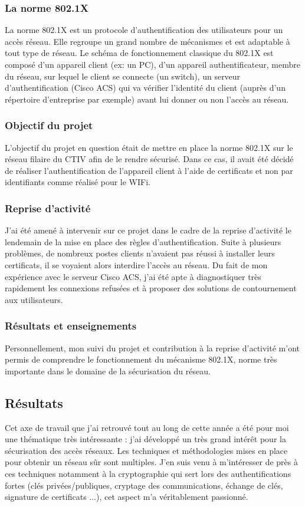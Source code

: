 \documentclass[a4paper,12pt]{report}
\begin{document}
\subsubsection{La norme 802.1X}
La norme 802.1X est un protocole d'authentification des utilisateurs pour un accès réseau. Elle regroupe un grand nombre de mécanismes et est adaptable à tout type de réseau. Le schéma de fonctionnement classique du 802.1X est composé d'un appareil client (ex: un PC), d'un appareil authentificateur, membre du réseau, sur lequel le client se connecte (un switch), un serveur d'authentification (Cisco ACS) qui va vérifier l'identité du client (auprès d'un répertoire d'entreprise par exemple) avant lui donner ou non l'accès au réseau.
\subsubsection{Objectif du projet}
L'objectif du projet en question était de mettre en place la norme 802.1X sur le réseau filaire du CTIV afin de le rendre sécurisé. Dans ce cas, il avait été décidé de réaliser l'authentification de l'appareil client à l'aide de certificats et non par identifiants comme réalisé pour le WIFi.
\subsubsection{Reprise d'activité}
J'ai été amené à intervenir sur ce projet dans le cadre de la reprise d'activité le lendemain de la mise en place des règles d'authentification. Suite à plusieurs problèmes, de nombreux postes clients n'avaient pas réussi à installer leurs certificats, il se voyaient alors interdire l'accès au réseau. Du fait de mon expérience avec le serveur Cisco ACS, j'ai été apte à diagnostiquer très rapidement les connexions refusées et à proposer des solutions de contournement aux utilisateurs.
\subsubsection{Résultats et enseignements}
Personnellement, mon suivi du projet et contribution à la reprise d'activité m'ont permis de comprendre le fonctionnement du mécanisme 802.1X, norme très importante dans le domaine de la sécurisation du réseau.

\subsection{Résultats}%
Cet axe de travail que j'ai retrouvé tout au long de cette année a été pour moi une thématique très intéressante : j'ai développé un très grand intérêt pour la sécurisation des accès réseaux. Les techniques et méthodologies mises en place pour obtenir un réseau sûr sont multiples. J'en suis venu à m'intéresser de près à ces techniques notamment à la cryptographie qui sert lors des authentifications fortes (clés privées/publiques, cryptage des communications, échange de clés, signature de certificats ...), cet aspect m'a véritablement passionné.
\end{document}
